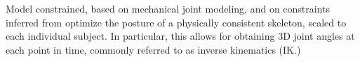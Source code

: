 Model constrained, based on mechanical joint modeling, and on constraints inferred from  
optimize the posture of a physically consistent skeleton, scaled to each individual subject. In particular, this allows for obtaining 3D joint angles at each point in time, commonly referred to as inverse kinematics (IK.)











